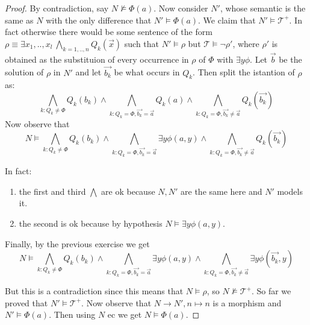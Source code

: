 \documentclass{article}
\begin{document}
\begin{proof}

	By contradiction, say $N \not \models \Phi(a)$. Now consider $N'$, whose semantic is the same as $N$ with the only difference that $N' \models \Phi(a)$.
	We claim that $N' \models \mathcal{T}^+$. 
	In fact otherwise there would be some sentence of the form $\rho \equiv \exists x_1,..,x_l \ \bigwedge_{k = 1,..,n} Q_k(\vec{x})$ such that
	$N' \models \rho$ but $\mathcal{T} \models \neg \rho'$, where $\rho'$ is obtained as the substituion of every occurrence in $\rho$ of $\Phi$ with $\exists y \phi$.
	Let $\vec{b}$ be the solution of $\rho$ in $N'$ and let $\vec{b_k}$ be what occurs in $Q_k$. Then split the istantion of $\rho$ as:
	\[
		\bigwedge_{k: Q_k \not = \Phi} Q_k(b_k) \land \bigwedge_{k: Q_k = \Phi, \vec{b_k} = \vec{a}} Q_k(a) \land \bigwedge_{k: Q_k = \Phi, \vec{b_k} \not = \vec{a}} Q_k(\vec{b_k})
	\]
	Now observe that 
	\[
		N \models \bigwedge_{k: Q_k \not = \Phi} Q_k(b_k) \land \bigwedge_{k: Q_k = \Phi, \vec{b_k} = \vec{a}} \exists y \phi(a,y) 
		\land \bigwedge_{k: Q_k = \Phi, \vec{b_k} \not = \vec{a}} Q_k(\vec{b_k})
	\]

	In fact:
	\begin{enumerate}
		\item	the first and third $\bigwedge$ are ok because $N,N'$ are the same here and $N'$ models it.
		\item	the second is ok because by hypothesis $N \models \exists y \phi(a,y)$.
	\end{enumerate}

	Finally, by the previous exercise we get
	\[
		N \models \bigwedge_{k: Q_k \not = \Phi} Q_k(b_k) \land \bigwedge_{k: Q_k = \Phi, \vec{b_k} = \vec{a}} \exists y \phi(a,y) \land 
		\bigwedge_{k: Q_k = \Phi, \vec{b_k} \not = \vec{a}} \exists y \phi(\vec{b_k},y)
	\]

	But this is a contradiction since this means that $N \models \rho$, so $N \not \models \mathcal{T}^+$.
	So far we proved that $N' \models \mathcal{T}^+$.
	Now observe that $N \to N', n \mapsto n$ is a morphism and $N' \models \Phi(a)$. Then using $N$ ec we get $N \models \Phi(a)$.

\end{proof}
\end{document}
